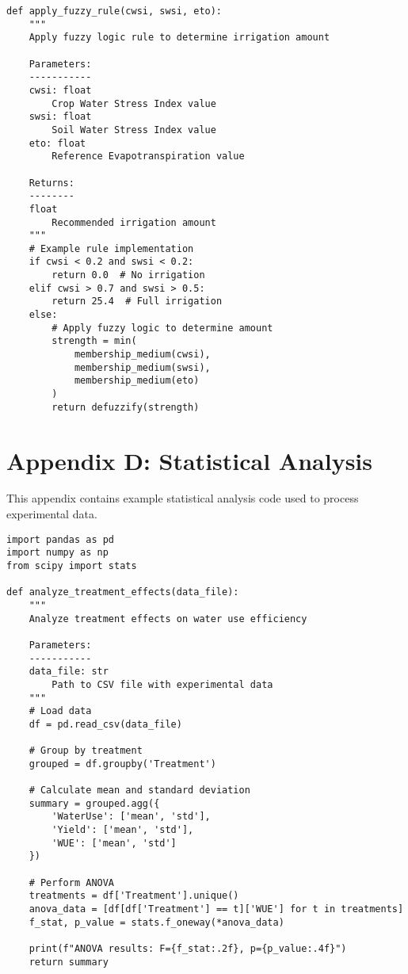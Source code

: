 \begin{lstlisting}
def apply_fuzzy_rule(cwsi, swsi, eto):
    """
    Apply fuzzy logic rule to determine irrigation amount
    
    Parameters:
    -----------
    cwsi: float
        Crop Water Stress Index value
    swsi: float
        Soil Water Stress Index value
    eto: float
        Reference Evapotranspiration value
        
    Returns:
    --------
    float
        Recommended irrigation amount
    """
    # Example rule implementation
    if cwsi < 0.2 and swsi < 0.2:
        return 0.0  # No irrigation
    elif cwsi > 0.7 and swsi > 0.5:
        return 25.4  # Full irrigation
    else:
        # Apply fuzzy logic to determine amount
        strength = min(
            membership_medium(cwsi),
            membership_medium(swsi),
            membership_medium(eto)
        )
        return defuzzify(strength)
\end{lstlisting}

\section{Appendix D: Statistical Analysis}
\label{app:statistical}

This appendix contains example statistical analysis code used to process experimental data.

\begin{lstlisting}
import pandas as pd
import numpy as np
from scipy import stats

def analyze_treatment_effects(data_file):
    """
    Analyze treatment effects on water use efficiency
    
    Parameters:
    -----------
    data_file: str
        Path to CSV file with experimental data
    """
    # Load data
    df = pd.read_csv(data_file)
    
    # Group by treatment
    grouped = df.groupby('Treatment')
    
    # Calculate mean and standard deviation
    summary = grouped.agg({
        'WaterUse': ['mean', 'std'],
        'Yield': ['mean', 'std'],
        'WUE': ['mean', 'std']
    })
    
    # Perform ANOVA
    treatments = df['Treatment'].unique()
    anova_data = [df[df['Treatment'] == t]['WUE'] for t in treatments]
    f_stat, p_value = stats.f_oneway(*anova_data)
    
    print(f"ANOVA results: F={f_stat:.2f}, p={p_value:.4f}")
    return summary
\end{lstlisting}